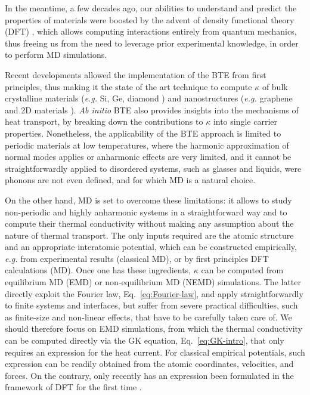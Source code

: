 In the meantime, a few decades ago, our abilities to understand and predict the properties of materials were boosted by the advent of density functional theory (DFT) \LE{[*ref*]}, which allows computing interactions entirely from quantum mechanics, thus freeing us from the need to leverage prior experimental knowledge, in order to perform MD simulations. 

Recent developments allowed the implementation of the BTE from first principles, thus making it the state of the art technique to compute $\kappa$ of bulk crystalline materials (\emph{e.g.} Si, Ge, diamond \cite{Broido:2007iu,Ward2009}) and nanostructures (\emph{e.g.} graphene and 2D materials \cite{Fugallo2014}). \emph{Ab initio} BTE also provides insights into the mechanisms of heat transport, by breaking down the contributions to $\kappa$ into single carrier properties. 
Nonetheless, the applicability of the BTE approach is limited to periodic materials at low temperatures, where the harmonic approximation of normal modes applies or anharmonic effects are very limited, and it cannot be straightforwardly applied to disordered systems, such as glasses and liquids, were phonons are not even defined, and for which MD is a natural choice. 

On the other hand, MD is set to overcome these limitations: it allows to study non-periodic and highly anharmonic systems in a straightforward way and to compute their thermal conductivity without making any assumption about the nature of thermal transport. The only inputs required are the atomic structure and an appropriate interatomic potential, which can be constructed empirically, \emph{e.g.} from experimental results (classical MD), or by first principles DFT calculations (\abinitio MD). Once one has these ingredients, $\kappa$ can be computed from equilibrium MD (EMD) or non-equilibrium MD (NEMD) simulations. The latter directly exploit the Fourier law, Eq.~\eqref{eq:Fourier-law}, and apply straightforwardly to finite systems and interfaces, but suffer from severe practical difficulties, such as finite-size and non-linear effects, that have to be carefully taken care of. 
We should therefore focus on EMD simulations, from which the thermal conductivity can be computed directly via the GK equation, Eq.~\eqref{eq:GK-intro}, that only requires an expression for the heat current. For classical empirical potentials, such expression can be readily obtained from the atomic coordinates, velocities, and forces. On the contrary, only recently has an expression been formulated in the framework of DFT for the first time \cite{Marcolongo2016}. 

